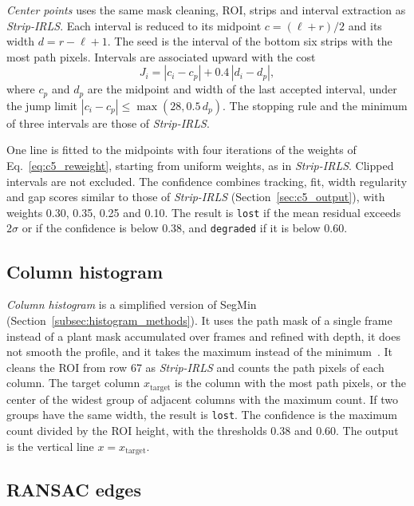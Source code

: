 \textit{Center points} uses the same mask cleaning, ROI, strips and interval extraction as \textit{Strip-IRLS}. Each interval is reduced to its midpoint $c=(\ell+r)/2$ and its width $d=r-\ell+1$. The seed is the interval of the bottom six strips with the most path pixels. Intervals are associated upward with the cost
\begin{equation}
    J_i = |c_i - c_p| + 0.4\, |d_i - d_p|,
    \label{eq:c5_center_cost}
\end{equation}
where $c_p$ and $d_p$ are the midpoint and width of the last accepted interval, under the jump limit $|c_i - c_p| \le \max(28, 0.5\, d_p)$. The stopping rule and the minimum of three intervals are those of \textit{Strip-IRLS}.

One line is fitted to the midpoints with four iterations of the weights of Eq.~\eqref{eq:c5_reweight}, starting from uniform weights, as in \textit{Strip-IRLS}. Clipped intervals are not excluded. The confidence combines tracking, fit, width regularity and gap scores similar to those of \textit{Strip-IRLS} (Section~\ref{sec:c5_output}), with weights 0.30, 0.35, 0.25 and 0.10. The result is \texttt{lost} if the mean residual exceeds $2\sigma$ or if the confidence is below 0.38, and \texttt{degraded} if it is below 0.60.

\subsection{Column histogram}
\label{subsec:c5_histogram_baseline}

\textit{Column histogram} is a simplified version of SegMin (Section~\ref{subsec:histogram_methods}). It uses the path mask of a single frame instead of a plant mask accumulated over frames and refined with depth, it does not smooth the profile, and it takes the maximum instead of the minimum~\cite{navone2025gpsfree}. It cleans the ROI from row 67 as \textit{Strip-IRLS} and counts the path pixels of each column. The target column $x_{\text{target}}$ is the column with the most path pixels, or the center of the widest group of adjacent columns with the maximum count. If two groups have the same width, the result is \texttt{lost}. The confidence is the maximum count divided by the ROI height, with the thresholds 0.38 and 0.60. The output is the vertical line $x=x_{\text{target}}$.

\subsection{RANSAC edges}
\label{subsec:c5_ransac_baseline}


